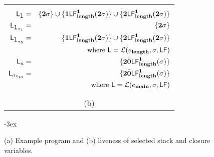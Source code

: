 \begin{figure}[t!]
\begin{tabular}{@{}c@{}}
\begin{minipage}{.51\textwidth}
      \small
\begin{eqnarray*}
 \Lv_{\xl} &=& \{\clazy\sigma\} \cup \{\acdr\Lf{\length}{\acdr}{\clazy\sigma}\} \cup \{\clazy\Lf{\length}{\acdr}{\clazy\sigma}\}\\
 \Lv_{\xl_{\pi_1}} &=& \{\clazy\sigma\} \\
 \Lv_{\xl_{\pi_5}} &=&  \{\acdr\Lf{\length}{\acdr}{\clazy\sigma}\} \cup \{\clazy\Lf{\length}{\acdr}{\clazy\sigma}\} \\
  &&     \mbox{where } \Lv = \mathcal{L}(e_{\length},\sigma,\Lfonly) \\
 \Lv_a &=& \{\clazy\bcar\Lf{\length}{\acdr}{\sigma}\}\\
\Lv_{a_{\pi_{10}}} &=&  \{\clazy\bcar\Lf{\length}{\acdr}{\sigma}\}\\
 &&       \mbox{where }  \Lv =  \mathcal{L}(e_{\main},\sigma,\Lfonly) 
\end{eqnarray*}
    \end{minipage} \\
(b)
  \end{tabular}
\kern -3ex
\caption{(a) Example program and (b) liveness of selected 
stack and closure variables.}\label{fig:mot-example2}
\end{figure}



